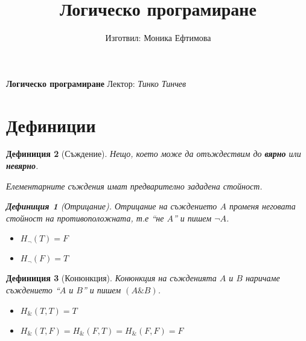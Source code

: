 \documentclass{article}
\def\Definitions{1}
\begin{document}
\newtheorem{mydef}{Дефиниция}
\newtheorem{prop}{Свойство}
\newtheorem{conseq}{Следствие}
\newtheorem{claim}{Твърдение}
\newtheorem{thm}{Теорема}
\newtheorem{lem}{Лема}
\newtheorem*{remark}{Забележка}
\newtheorem*{example}{Пример}


\title{Логическо програмиране}

\author{Изготвил: Моника Ефтимова} 
\date{}


\begin{titlepage}
\begin{center}
\Huge{\textbf{Логическо програмиране}}
\vfill
\Large {
Лектор:\textit{ Тинко Тинчев }}
\end{center}

\end{titlepage}

\ifcase\Definitions\or
\section*{Дефиниции}
\begin{mydef}[Съждение]
Нещо, което може да отъждествим до \textbf{вярно} или \textbf{невярно}.

Елементарните съждения имат предварително зададена стойност.

\begin{mydef}[Отрицание]
Отрицание на съждението $A$ променя неговата стойност на противоположната, т.е ``не $A$'' и пишем $\neg A$.

\begin{itemize}
\item $H_\neg(T) = F$
\item $H_\neg(F) = T$
\end{itemize}
\end{mydef}

\end{mydef}

\begin{mydef}[Конюнкция]
Конюнкция на съжденията $A$ и $B$ наричаме съждението  ``$A$ и $B$'' и пишем $(A \& B)$.

\begin{itemize}
\item $H_\&(T,T) = T$
\item $H_\&(T,F) = H_\&(F, T) = H_\&(F,F) = F$
\end{itemize}

\end{mydef}
\end{document}
